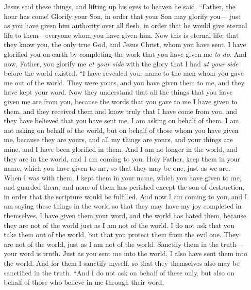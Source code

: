 \begin{biblechapter} %
 Jesus said these things, and lifting up his eyes to heaven he said, “Father, the hour has come! Glorify your Son, in order that your Son may glorify you—
\verse just as you have given him authority over all flesh, in order that he would give eternal life to them—everyone whom you have given him.
\verse Now this is eternal life: that they know you, the only true God, and Jesus Christ, whom you have sent.
\verse I have glorified you on earth by completing the work that you have given me \textit{to do}.
\verse And now, Father, you glorify me \textit{at your side} with the glory that I had \textit{at your side} before the world existed.
 “I have revealed your name to the men whom you gave me out of the world. They were yours, and you have given them to me, and they have kept your word.
\verse Now they understand that all the things that you have given me are from you,
\verse because the words that you gave to me I have given to them, and they received them and know truly that I have come from you, and they have believed that you have sent me.
\verse I am asking on behalf of them. I am not asking on behalf of the world, but on behalf of those whom you have given me, because they are yours,
\verse and all my things are yours, and your things are mine, and I have been glorified in them.
\verse And I am no longer in the world, and they are in the world, and I am coming to you. Holy Father, keep them in your name, which you have given to me, so that they may be one, just as we are.
\verse When I was with them, I kept them in your name, which you have given to me, and guarded them, and none of them has perished except the son of destruction, in order that the scripture would be fulfilled.
\verse And now I am coming to you, and I am saying these things in the world so that they may have my joy completed in themselves.
\verse I have given them your word, and the world has hated them, because they are not of the world just as I am not of the world.
\verse I do not ask that you take them out of the world, but that you protect them from the evil one.
\verse They are not of the world, just as I am not of the world.
\verse Sanctify them in the truth—your word is truth.
\verse Just as you sent me into the world, I also have sent them into the world.
\verse And for them I sanctify myself, so that they themselves also may be sanctified in the truth.
 “And I do not ask on behalf of these only, but also on behalf of those who believe in me through their word,

\end{biblechapter}

